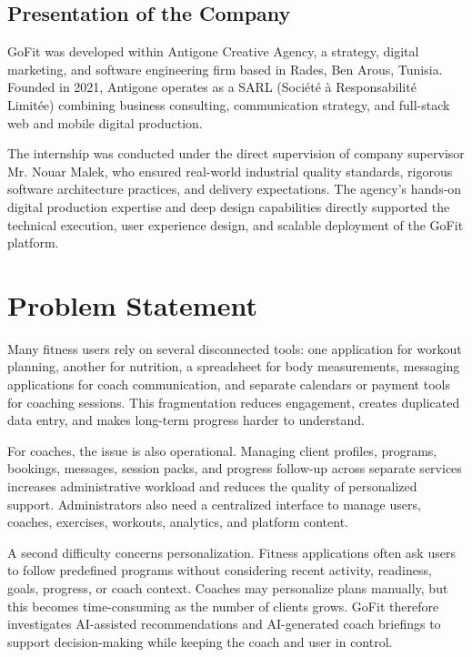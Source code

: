 \documentclass[12pt,a4paper,openany]{report}
\begin{document}
\subsection{Presentation of the Company}

GoFit was developed within Antigone Creative Agency, a strategy, digital marketing, and software engineering firm based in Rades, Ben Arous, Tunisia. Founded in 2021, Antigone operates as a SARL (Société à Responsabilité Limitée) combining business consulting, communication strategy, and full-stack web and mobile digital production.


The internship was conducted under the direct supervision of company supervisor Mr. Nouar Malek, who ensured real-world industrial quality standards, rigorous software architecture practices, and delivery expectations. The agency's hands-on digital production expertise and deep design capabilities directly supported the technical execution, user experience design, and scalable deployment of the GoFit platform.


\section{Problem Statement}

Many fitness users rely on several disconnected tools: one application for workout planning, another for nutrition, a spreadsheet for body measurements, messaging applications for coach communication, and separate calendars or payment tools for coaching sessions. This fragmentation reduces engagement, creates duplicated data entry, and makes long-term progress harder to understand.


For coaches, the issue is also operational. Managing client profiles, programs, bookings, messages, session packs, and progress follow-up across separate services increases administrative workload and reduces the quality of personalized support. Administrators also need a centralized interface to manage users, coaches, exercises, workouts, analytics, and platform content.


A second difficulty concerns personalization. Fitness applications often ask users to follow predefined programs without considering recent activity, readiness, goals, progress, or coach context. Coaches may personalize plans manually, but this becomes time-consuming as the number of clients grows. GoFit therefore investigates AI-assisted recommendations and AI-generated coach briefings to support decision-making while keeping the coach and user in control.
\end{document}
